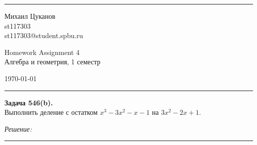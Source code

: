 \documentclass[a4paper, 12pt]{article}
\newenvironment{problem}[2][Задача]
    { \begin{mdframed}[backgroundcolor=gray!10] \textbf{#1 #2.} \\}
    {  \end{mdframed}}
\newenvironment{solution}
    {\textit{Решение: }}
    {\noindent\rule{7in}{1.5pt}}
\begin{document}

\fancyhead[C]{}
\hrule \medskip %
\begin{minipage}{0.295\textwidth}
\raggedright\footnotesize
Михаил Цуканов \hfill\\
st117303 \hfill\\
st117303@student.spbu.ru
\end{minipage}
\begin{minipage}{0.4\textwidth}
\centering\large
Homework Assignment 4\\
\normalsize
Алгебра и геометрия, 1 семестр\\
\end{minipage}
\begin{minipage}{0.295\textwidth}
\raggedleft
\today\hfill\\
\end{minipage}
\medskip\hrule
\bigskip


%
%
%


\begin{problem}{546(b)}
Выполнить деление с остатком $x^3-3x^2-x-1$ на $3x^2-2x+1$.
\end{problem}
\begin{solution}


\end{solution}
\end{document}
